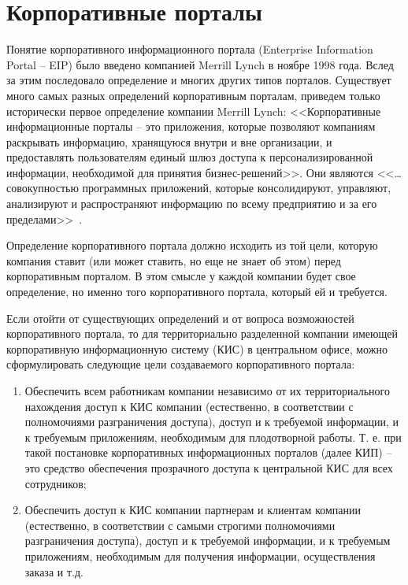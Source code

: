 \section{Корпоративные порталы}

Понятие корпоративного информационного портала (Enterprise Information Portal --
EIP) было введено компанией Merrill Lynch в ноябре 1998 года. Вслед за этим
последовало определение и многих других типов порталов.
Существует много самых разных определений корпоративным порталам, приведем
только исторически первое определение компании Merrill Lynch: <<Корпоративные
информационные порталы -- это приложения, которые позволяют компаниям раскрывать
информацию, хранящуюся внутри и вне организации, и предоставлять пользователям
единый шлюз доступа к персонализированной информации, необходимой для принятия
бизнес-решений>>. Они являются <<…совокупностью программных приложений, которые
консолидируют, управляют, анализируют и распространяют информацию по всему
предприятию и за его пределами>>~\cite{kis_eip}.

Определение корпоративного портала должно исходить из той цели, которую компания
ставит (или может ставить, но еще не знает об этом) перед корпоративным
порталом. В этом смысле у каждой компании будет свое определение, но именно того
корпоративного портала, который ей и требуется.

Если отойти от существующих определений и от вопроса возможностей корпоративного
портала, то для территориально разделенной компании имеющей корпоративную
информационную систему (КИС) в центральном офисе, можно сформулировать следующие
цели создаваемого корпоративного портала:
\begin{enumerate}
  \item Обеспечить всем работникам компании независимо от их территориального
нахождения доступ к КИС компании (естественно, в соответствии с полномочиями
разграничения доступа), доступ и к требуемой информации, и к требуемым
приложениям, необходимым для плодотворной работы. Т. е. при такой постановке
корпоративных информационных порталов (далее КИП) -- это средство обеспечения
прозрачного доступа к центральной КИС для всех сотрудников;
\item Обеспечить доступ к КИС компании партнерам и клиентам компании (естественно,
в соответствии с самыми строгими полномочиями разграничения доступа), доступ и к
требуемой информации, и к требуемым приложениям, необходимым для получения
информации, осуществления заказа и т.д.
\end{enumerate}

